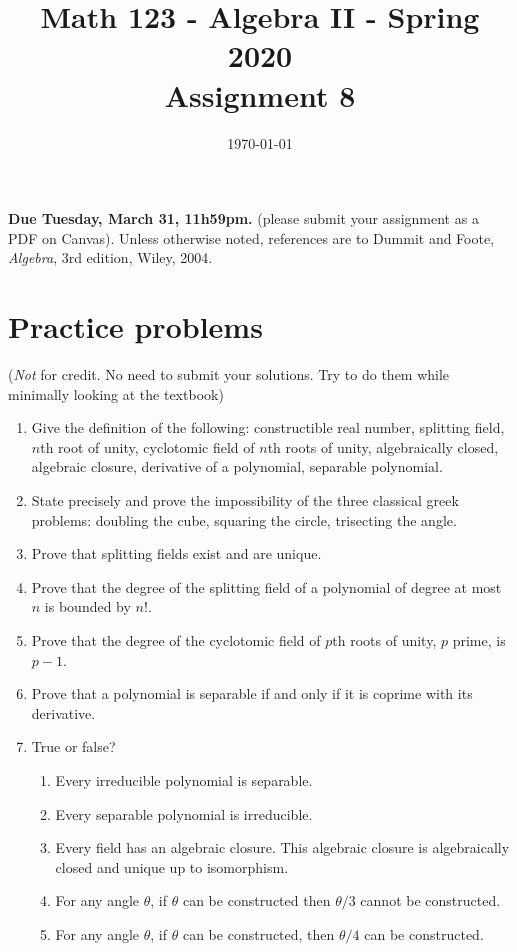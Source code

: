 \documentclass{amsart}
\title[Math 123, Spring 2020: assignment 8]{Math 123 - Algebra II - Spring 2020 \\ Assignment 8}
\date{\today}
\theoremstyle{definition}
\begin{document}

\vspace*{-10em}
\maketitle

\textbf{Due Tuesday, March 31, 11h59pm.} (please submit your assignment as a PDF on Canvas). Unless otherwise noted, references are to Dummit and Foote, \emph{Algebra}, 3rd edition, Wiley, 2004.

\section*{Practice problems} (\emph{Not} for credit. No need to submit your solutions. Try to do them while minimally looking at the textbook)

\begin{enumerate}
\item Give the definition of the following: constructible real number, splitting field, $n$th root of unity, cyclotomic field of $n$th roots of unity, algebraically closed, algebraic closure, derivative of a polynomial, separable polynomial.
\item State precisely and prove the impossibility of the three classical greek problems: doubling the cube, squaring the circle, trisecting the angle.
\item Prove that splitting fields exist and are unique.
\item Prove that the degree of the splitting field of a polynomial of degree at most $n$ is bounded by $n!$.
\item Prove that the degree of the cyclotomic field of $p$th roots of unity, $p$ prime, is $p - 1$.
\item Prove that a polynomial is separable if and only if it is coprime with its derivative.
\item True or false?
  \begin{enumerate}
  \item Every irreducible polynomial is separable.
  \item Every separable polynomial is irreducible.
  \item Every field has an algebraic closure. This algebraic closure is algebraically closed and unique up to isomorphism.
  \item For any angle $\theta$, if $\theta$ can be constructed then $\theta / 3$ cannot be constructed.
  \item For any angle $\theta$, if $\theta$ can be constructed, then $\theta / 4$ can be constructed.
  \end{enumerate}
\end{enumerate}
\end{document}
